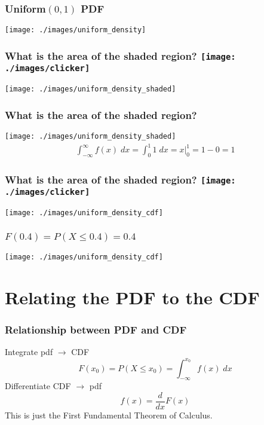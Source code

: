 \begin{frame}
\frametitle{Uniform$(0,1)$ PDF}
\centering
	\texttt{[image: ./images/uniform\_density]}

\end{frame}


\begin{frame}
\frametitle{What is the area of the shaded region? \hfill \texttt{[image: ./images/clicker]}}

\centering
	\texttt{[image: ./images/uniform\_density\_shaded]}

\end{frame}



\begin{frame}
\frametitle{What is the area of the shaded region?}

\centering
	\texttt{[image: ./images/uniform\_density\_shaded]}
\begin{eqnarray*}
	\int_{-\infty}^{\infty} f(x) \; dx = \int_{0}^1 1 \; dx = \left. x \right|_0^1 = 1 - 0 = 1
\end{eqnarray*}
\end{frame}





\begin{frame}
\frametitle{What is the area of the shaded region? \hfill \texttt{[image: ./images/clicker]}}
\centering
	\texttt{[image: ./images/uniform\_density\_cdf]}

\end{frame}



\begin{frame}
\frametitle{$F(0.4) = P(X\leq 0.4) = 0.4$}
\centering
	\texttt{[image: ./images/uniform\_density\_cdf]}

\end{frame}


\section{Relating the PDF to the CDF}


\begin{frame}
\frametitle{Relationship between PDF and CDF}

Integrate pdf $\rightarrow$ CDF
	$$F(x_0) = P(X\leq x_0) = \int_{-\infty}^{x_0} f(x)\; dx$$
Differentiate CDF $\rightarrow$ pdf
 	$$f(x) =\frac{d}{dx}F(x)$$
\alert{This is just the First Fundamental Theorem of Calculus.}
\end{frame}


